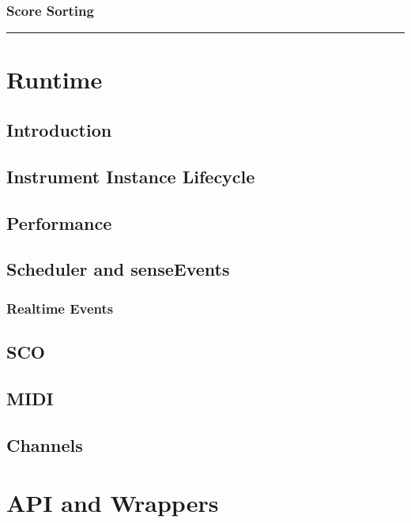 \documentclass[]{book}
\begin{document}
\subsection{Score Sorting}

\begin{center}\rule{3in}{0.4pt}\end{center}


\chapter{Runtime}

\section{Introduction}

\section{Instrument Instance Lifecycle}

\section{Performance}

\section{Scheduler and senseEvents}

\subsection{Realtime Events}

\section{SCO}

\section{MIDI}

\section{Channels}


\chapter{API and Wrappers}
\end{document}
